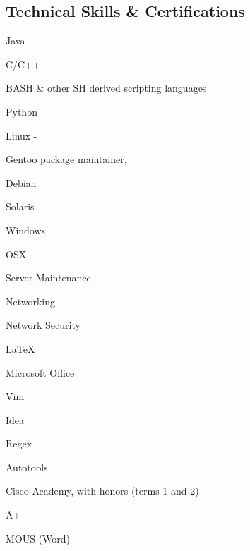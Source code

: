 \documentclass[a4paper,margin,line]{resume}
\begin{document}
\begin{resume}
\section{\mysidestyle Technical Skills \& Certifications}
	\begin{compactdesc}
		\item[Languages] \begin{inparaenum} { \small
			\item Java
			\item C/C++
			\item BASH \& other SH derived scripting languages
			\item Python
		} \end{inparaenum}
		\item[Operating Systems] \begin{inparaenum} { \small
			\item Linux -
			\begin{inparablank}
				\item Gentoo package maintainer,
				\item Debian
			\end{inparablank}
			\item Solaris
			\item Windows
			\item OSX
		} \end{inparaenum}
		\item[Hardware] \begin{inparaenum} { \small
			\item Server Maintenance
			\item Networking
			\item Network Security
		} \end{inparaenum}
		\item[Tools] \begin{inparaenum} { \small
			\item \LaTeX
			\item Microsoft Office
			\item Vim
			\item Idea
			\item Regex
			\item Autotools
		} \end{inparaenum}
		\item[Certifications] \begin{inparaenum} { \small
			\item Cisco Academy, with honors (terms 1 and 2)
			\item A+
			\item MOUS (Word)
		} \end{inparaenum}
	\end{compactdesc}


\end{resume}
\end{document}
